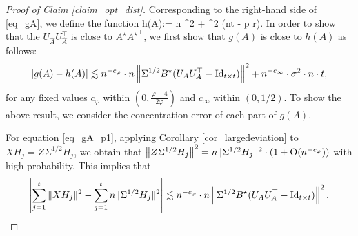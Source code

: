 	\begin{proof}[Proof of Claim \ref{claim_opt_dist}]
	Corresponding to the right-hand side of \eqref{eq_gA}, we define the function
	\be\label{same_hA}h(A):= n ^2 + \sigma^2 (n\cdot t - p \cdot r).\ee
	In order to show that the $U_{\hat{A}}U_{\hat{A}}^\top$ is close to $A^\star {A^\star}^\top$, we first show that $g(A)$ is close to $h(A)$ as follows:
	\begin{align}\label{eq_gA_err}
		{\left| {g(A) - h(A)} \right|} \lesssim  n^{-c_{\varphi}} \cdot n \left\| \Sigma^{1/2} B^{\star} (U_AU_A^{\top} - \operatorname{Id}_{t\times t}) \right\|^2 + n^{-c_{\infty}} \cdot \sigma^2 \cdot n \cdot t,
	\end{align}
	for any fixed values $c_{\varphi}$ within $(0, \frac{\varphi-4}{2\varphi})$ and $c_{\infty}$ within $(0, 1/2)$. 
	To show the above result, we consider the concentration error of each part of $g(A)$.

	For equation \eqref{eq_gA_p1}, %
	applying Corollary \ref{cor_largedeviation} to $X H_j = Z \Sigma^{1/2} H_j$, we obtain that 
	${\left\|Z \Sigma^{1/2} H_j \right\|^2 } = { n \|\Sigma^{1/2} H_j\|^2} \cdot (1 + \operatorname{O}(n^{-c_\varphi}))$ with high probability. 
	This implies that
	\begin{align}
		\left\lvert\sum_{j=1}^t \|X H_j\|^2 -  \sum_{j=1}^t n\|\Sigma^{1/2} H_j\|^2\right\rvert \lesssim   n^{-c_{\varphi}} \cdot n  \left\| \Sigma^{1/2} B^{\star} (U_{A}U_A^{\top} - \operatorname{Id}_{t\times t}) \right\|^2. \label{eq_gA_err1}
	\end{align}


\end{proof}
